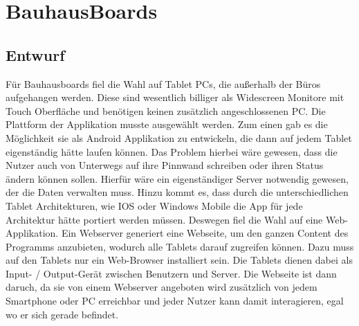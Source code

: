 \chapter{BauhausBoards}\label{BauhausBoards}
\section{Entwurf}\label{Entwurf}

Für Bauhausboards fiel die Wahl auf Tablet PCs, die außerhalb der Büros aufgehangen werden.
Diese sind wesentlich billiger als Widescreen Monitore mit Touch Oberfläche und benötigen keinen zusätzlich angeschlossenen PC.
Die Plattform der Applikation musste ausgewählt werden. Zum einen gab es die Möglichkeit sie als Android Applikation zu entwickeln, die dann auf jedem Tablet eigenständig hätte laufen können. Das Problem hierbei wäre gewesen, dass die Nutzer auch von Unterwegs auf ihre Pinnwand schreiben oder ihren Status ändern können sollen. Hierfür wäre ein eigenständiger Server notwendig gewesen, der die Daten verwalten muss. Hinzu kommt es, dass durch die unterschiedlichen Tablet Architekturen, wie IOS oder Windows Mobile die App für jede Architektur hätte portiert werden müssen.
Deswegen fiel die Wahl auf eine Web-Applikation. Ein Webserver generiert eine Webseite, um den ganzen Content des Programms anzubieten, wodurch alle Tablets  darauf zugreifen können. Dazu muss auf den Tablets nur ein Web-Browser installiert sein.
Die Tablets dienen dabei als Input- / Output-Gerät zwischen Benutzern und Server. Die Webseite ist dann daruch, da sie von einem Webserver angeboten wird zusätzlich von jedem Smartphone oder PC erreichbar und jeder Nutzer kann damit interagieren, egal wo er sich gerade befindet.

